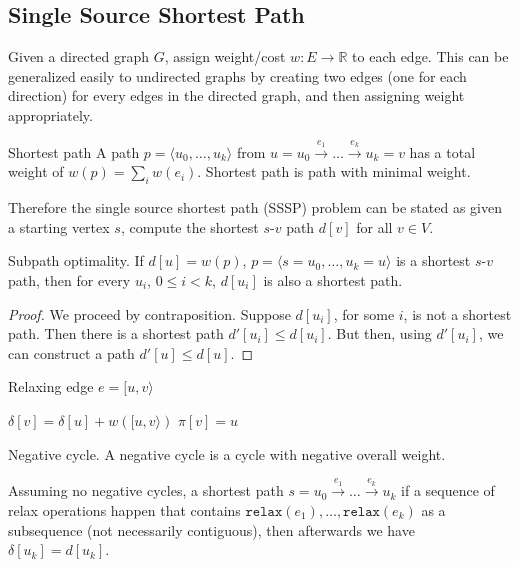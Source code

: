 \subsection{Single Source Shortest Path}
Given a directed graph $G$, assign weight/cost $w: E\rightarrow\mathbb{R}$ to
each edge.  This can be generalized easily to undirected graphs by creating two
edges (one for each direction) for every edges in the directed graph, and then
assigning weight appropriately.
\begin{definition}{Shortest path}
  A path $p=\langle u_0,\ldots,u_k\rangle$ from
  $u=u_0\xrightarrow{e_1}\ldots\xrightarrow{e_k} u_k=v$ has a total weight of
  $w(p)=\sum_i w(e_i)$.  Shortest path is path with minimal weight.
\end{definition}

Therefore the single source shortest path (SSSP) problem can be stated as given
a starting vertex $s$, compute the shortest $s$-$v$ path $d[v]$ for all $v\in
V$.

\begin{theorem}{Subpath optimality.}
  \label{graph:subpath-optimality}
  If $d[u]=w(p)$, $p=\langle s=u_0,\ldots,u_k=u\rangle$ is a shortest $s$-$v$
  path, then for every $u_i$, $0\leq i<k$, $d[u_i]$ is also a shortest path.
\end{theorem}
\begin{proof}
  We proceed by contraposition.  Suppose $d[u_i]$, for some $i$, is not
  a shortest path.  Then there is a shortest path $d'[u_i]\leq d[u_i]$.  But
  then, using $d'[u_i]$, we can construct a path $d'[u]\leq d[u]$.
\end{proof}

\begin{algorithm}
  \caption{Relaxing edge $e=[u,v\rangle$}\label{graph:edge-relax}
  \begin{algorithmic}
      \If{$\delta[u]+w([u,v\rangle)<\delta[v]$}
      \State $\delta[v]=\delta[u]+w([u,v\rangle)$
      \State $\pi[v]=u$
      \EndIf
    \EndFunction
  \end{algorithmic}
\end{algorithm}

\begin{definition}{Negative cycle.}
  A negative cycle is a cycle with negative overall weight.
\end{definition}

\begin{lemma}
  \label{graph:relax}
  Assuming no negative cycles, a shortest path
  $s=u_0\xrightarrow{e_1}\ldots\xrightarrow{e_k}u_k$ if a sequence of relax
  operations happen that contains
  $\texttt{relax}(e_1),\ldots,\texttt{relax}(e_k)$ as a subsequence (not
  necessarily contiguous), then afterwards we have $\delta[u_k]=d[u_k]$.
\end{lemma}

